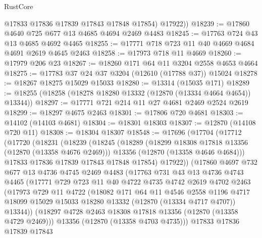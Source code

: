 \begin{lexlean}{RustCore}
\begin{coremodule}
          @17833
          @17836
          @17839
          @17843
          @17848
          @17854)
        @17922))
@18239 := @17860 @4640 @725 @677 @13 @4685 @4694 @2469 @4483
@18245 := @17763 @724 @43 @13 @4685 @4692 @4465
@18255 := @17771 @718 @723 @11 @40 @4669 @4684 @4691 @2619 @4645 @2463
@18258 := @17973 @718 @11 @4669
@18260 := @17979 @206 @23
@18267 := @18260 @171 @64 @11 @3204 @2558 @4653 @4664
@18275 := @17783 @37 @24 @37 @3204 (@12610 (@17788 @37)) @15024
@18278 := @18267 @18275 @15029 @15033
@18280 := @13314 (@15035 @171)
@18289 := @18255 (@18258 (@18278 @18280 @13332 (@12870 (@13334 @4664 @4654)) @13344))
@18297 := @17771 @721 @214 @11 @27 @4681 @2469 @2524 @2619
@18299 := @18297 @4675 @2463
@18301 := @17806 @720 @4681
@18303 := @14102 (@14103 @4681)
@18304 := @18301 @18303
@18307 := @12870 (@14108 @720 @11)
@18308 := @18304 @18307
@18548 := @17696
    (@17704
      (@17712
        (@17720
          (@18231
            (@18239
              (@18245
                (@18289
                  (@18299 @18308 @17818 @13356 (@12870 (@13358 @4676 @2469)))
                  @13356
                  (@12870 (@13358 @4646 @4684)))
                @17833
                @17836
                @17839
                @17843
                @17848
                @17854)
              @17922))
          (@17860
            @4697
            @732
            @677
            @13
            @4736
            @4745
            @2469
            @4483
            (@17763
              @731
              @43
              @13
              @4736
              @4743
              @4465
              (@17771
                @729
                @723
                @11
                @40
                @4722
                @4735
                @4742
                @2619
                @4702
                @2463
                (@17973
                  @729
                  @11
                  @4722
                  (@18082
                    @171
                    @64
                    @11
                    @4546
                    @2558
                    @1196
                    @4717
                    @18099
                    @15029
                    @15033
                    @18280
                    @13332
                    (@12870 (@13334 @4717 @4707))
                    @13344))
                (@18297 @4728 @2463 @18308 @17818 @13356 (@12870 (@13358 @4729 @2469)))
                @13356
                (@12870 (@13358 @4703 @4735)))
              @17833
              @17836
              @17839
              @17843

\end{coremodule}
\end{lexlean}
